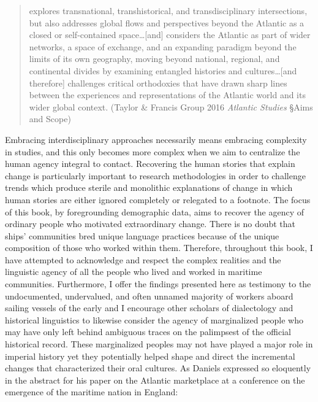 \begin{quotation}
explores transnational, transhistorical, and transdisciplinary intersections, but also addresses global flows and perspectives beyond the Atlantic as a closed or self-contained space…[and] considers the Atlantic as part of wider networks, a space of exchange, and an expanding paradigm beyond the limits of its own geography, moving beyond national, regional, and continental divides by examining entangled histories and cultures…[and therefore] challenges critical orthodoxies that have drawn sharp lines between the experiences and representations of the Atlantic world and its wider global context. (Taylor \& Francis Group 2016 \textit{Atlantic Studies} §Aims and Scope)
\end{quotation}

Embracing interdisciplinary approaches necessarily means embracing complexity in  studies, and this only becomes more complex when we aim to centralize the human agency integral to  contact. Recovering the human stories that explain  change is particularly important to  research methodologies in order to challenge trends which produce sterile and monolithic explanations of  change in which human stories are either ignored completely or relegated to a footnote. The focus of this book, by foregrounding demographic data, aims to recover the agency of ordinary people who motivated extraordinary change. There is no doubt that ships’ communities bred unique language practices because of the unique composition of those who worked within them. Therefore, throughout this book, I have attempted to acknowledge and respect the complex realities and the linguistic agency of all the people who lived and worked in maritime communities. Furthermore, I offer the findings presented here as testimony to the undocumented, undervalued, and often unnamed majority of workers aboard sailing vessels of the early  and I encourage other scholars of dialectology and historical linguistics to likewise consider the agency of marginalized people who may have only left behind ambiguous traces on the palimpsest of the official historical record. These marginalized peoples may not have played a major role in imperial history yet they potentially helped shape and direct the incremental changes that characterized their oral cultures. As Daniels expressed so eloquently in the abstract for his paper on the Atlantic marketplace at a conference on the emergence of the maritime nation in England:

